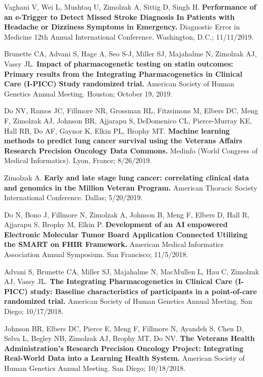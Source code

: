 \documentclass[10pt]{article}
\begin{document}
Vaghani V, Wei L, Mushtaq U, Zimolzak A, Sittig D, Singh H.
\textbf{Performance of an e-Trigger to Detect Missed Stroke Diagnosis
  In Patients with Headache or Dizziness Symptoms in Emergency.}
Diagnostic Error in Medicine 12th Annual International Conference.
Washington, D.C.; 11/11/2019.


Brunette CA, Advani S, Hage A, Seo S-J, Miller SJ, Majahalme N,
Zimolzak AJ, Vassy JL. \textbf{Impact of pharmacogenetic testing on
  statin outcomes: Primary results from the Integrating
  Pharmacogenetics in Clinical Care (I-PICC) Study randomized trial.}
American Society of Human Genetics Annual Meeting. Houston; October
19, 2019.

Do NV, Ramos JC, Fillmore NR, Grossman RL, Fitzsimons M, Elbers DC,
Meng F, Zimolzak AJ, Johnson BR, Ajjarapu S, DeDomenico CL,
Pierce-Murray KE, Hall RB, Do AF, Gaynor K, Elkin PL, Brophy MT.
\textbf{Machine learning methods to predict lung cancer survival using
  the Veterans Affairs Research Precision Oncology Data Commons.}
Medinfo (World Congress of Medical Informatics). Lyon, France;
8/26/2019.

Zimolzak A. \textbf{Early and late stage lung cancer: correlating
  clinical data and genomics in the Million Veteran Program.} American
Thoracic Society International Conference. Dallas; 5/20/2019.

Do N, Bono J, Fillmore N, Zimolzak A, Johnson B, Meng F, Elbers D,
Hall R, Ajjarapu S, Brophy M, Elkin P. \textbf{Development of an AI
  empowered Electronic Molecular Tumor Board Application Connected
  Utilizing the SMART on FHIR Framework.} American Medical Informatics
Association Annual Symposium. San Francisco; 11/5/2018.

Advani S, Brunette CA, Miller SJ, Majahalme N, MacMullen L, Hau C,
Zimolzak AJ, Vassy JL. \textbf{The Integrating Pharmacogenetics in
  Clinical Care (I-PICC) study: Baseline characteristics of
  participants in a point-of-care randomized trial.} American Society
of Human Genetics Annual Meeting. San Diego; 10/17/2018.

Johnson BR, Elbers DC, Pierce E, Meng F, Fillmore N, Ayandeh S, Chen
D, Selva L, Begley NB, Zimolzak AJ, Brophy MT, Do NV. \textbf{The
  Veterans Health Administration's Research Precision Oncology
  Project: Integrating Real-World Data into a Learning Health System.}
American Society of Human Genetics Annual Meeting. San Diego;
10/18/2018.
\end{document}
